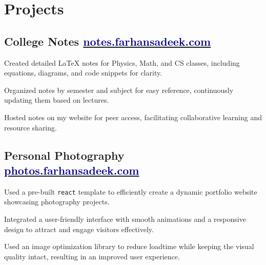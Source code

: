 \documentclass[]{Farhan_Resume_Class}
\begin{document}
\begin{minipage}[t]{0.70\textwidth}
    \section{Projects}
\subsection{{College Notes \hfill \href{https://notes.farhansadeek.com}{\textcolor{darkblue}{\lowercase{notes.farhansadeek.com}}}}}
        \begin{tightemize}
            \vspace{10pt}
            \item Created detailed LaTeX notes for Physics, Math, and CS classes, including equations, diagrams, and code snippets for clarity.
            \item Organized notes by semester and subject for easy reference, continuously updating them based on lectures.
            \item Hosted notes on my website for peer access, facilitating collaborative learning and resource sharing.
        \end{tightemize}                                                                           
\subsection{{Personal Photography \hfill \href{https://photos.farhansadeek.com}{\textcolor{darkblue}{\lowercase{photos.farhansadeek.com}}}}}
    \begin{tightemize}
        \vspace{10pt}
        \item Used a pre-built \texttt{react} template to efficiently create a dynamic portfolio website showcasing photography projects. 
\item Integrated a user-friendly interface with smooth animations and a responsive design to attract and engage visitors effectively. 
\item Used an image optimization library to reduce loadtime while keeping the visual quality intact, resulting in an improved user experience. 
    \end{tightemize}


\end{minipage}
\end{document}
